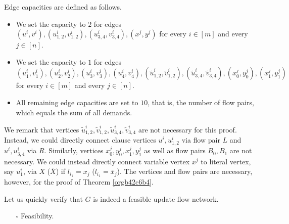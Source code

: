 \documentclass[fontsize=11pt,paper=a4]{book}
\begin{document}
Edge capacities are defined as follows.

\begin{itemize}
\item We set the capacity to \(2\) for edges \((u^i,v^i),(u_{1,2}^i,v_{1,2}^i),(u_{3,4}^i,v_{3,4}^i),(x^j,y^j)\) for every \(i\in[m]\) and every \(j\in[n]\).
\item We set the capacity to \(1\) for edges \((u_1^i,v_1^i),(u_2^i,v_2^i),(u_3^i,v_3^i),(u_4^i,v_4^i),(\tilde{u}_{1,2}^i,\tilde{v}_{1,2}^i),(\tilde{u}_{3,4}^i,\tilde{v}_{3,4}^i),(x_0^j,y_0^j),(x_1^j,y_1^j)\) for every \(i\in[m]\) and every \(j\in[n]\).
\item All remaining edge capacities are set to \(10\), that is, the number of flow pairs, which equals the sum of all demands.
\end{itemize}

We remark that vertices \(\tilde{u}_{1,2}^i,\tilde{v}_{1,2}^i,\tilde{u}_{3,4}^i,\tilde{v}_{3,4}^i\) are not necessary for this proof.
Instead, we could directly connect clause vertices \(u^i,u_{1,2}^i\) via flow pair \(L\) and \(u^i,u_{3,4}^i\) via \(R\). Similarly, vertices \(x_0^j,y_0^j,x_1^j,y_1^j\) as well as flow pairs \(B_0,B_1\) are not necessary.
We could instead directly connect variable vertex \(x^j\) to literal vertex, say \(u_1^i\), via \(X\) (\(\bar{X}\)) if \(l_{i_1}=x_j\) (\(l_{i_1}=\bar{x}_j\)).
The vertices and flow pairs are necessary, however, for the proof of Theorem \ref{orgb42c6b4}.

Let us quickly verify that \(G\) is indeed a feasible update flow network.

\begin{itemize}
\item[{$\square$}] Feasibility.
\end{itemize}
\end{document}
